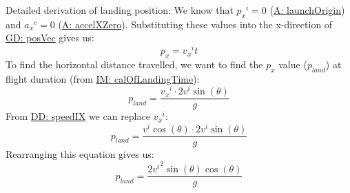 \documentclass[12pt]{article}
\begin{document}
Detailed derivation of landing position:
We know that ${{p_{x}}^{i}}=0$ (\hyperref[launchOrigin]{A: launchOrigin}) and ${{a_{x}}^{c}}=0$ (\hyperref[accelXZero]{A: accelXZero}). Substituting these values into the x-direction of \hyperref[GD:posVec]{GD: posVec} gives us:
\begin{displaymath}
{p_{x}}={{v_{x}}^{i}} t
\end{displaymath}
To find the horizontal distance travelled, we want to find the ${p_{x}}$ value (${p_{land}}$) at flight duration (from \hyperref[IM:calOfLandingTime]{IM: calOfLandingTime}):
\begin{displaymath}
{p_{land}}=\frac{{{v_{x}}^{i}}\cdot{}2 {v^{i}} \sin\left(θ\right)}{g}
\end{displaymath}
From \hyperref[DD:speedIX]{DD: speedIX} we can replace ${{v_{x}}^{i}}$:
\begin{displaymath}
{p_{land}}=\frac{{v^{i}} \cos\left(θ\right)\cdot{}2 {v^{i}} \sin\left(θ\right)}{g}
\end{displaymath}
Rearranging this equation gives us:
\begin{displaymath}
{p_{land}}=\frac{2 {v^{i}}^{2} \sin\left(θ\right) \cos\left(θ\right)}{g}
\end{displaymath}
\par~
\end{document}
